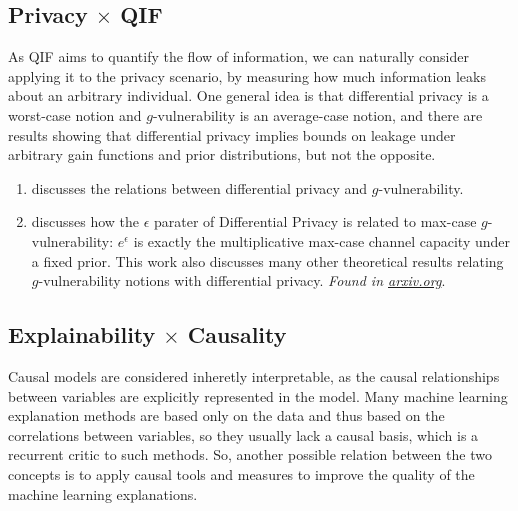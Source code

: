\subsection{Privacy $\times$ QIF}

As QIF aims to quantify the flow of information, we can naturally consider applying it to the privacy scenario, by measuring how much information leaks about an arbitrary individual. One general idea is that differential privacy is a worst-case notion and $g$-vulnerability is an average-case notion, and there are results\cite{QIF} showing that differential privacy implies bounds on leakage under arbitrary gain functions and prior distributions, but not the opposite.

\begin{enumerate}
\item \cite{On the information leakage of Differentially Private Mechanisms} discusses the relations between differential privacy and $g$-vulnerability. 

\item \cite{Explaining epsilon in local differential privacy through the lens of quantitative information flow} discusses how the $\epsilon$ parater of Differential Privacy is related to max-case $g$-vulnerability: $e^\epsilon$ is exactly the multiplicative max-case channel capacity under a fixed prior. This work also discusses many other theoretical results relating $g$-vulnerability notions with differential privacy. \emph{Found in \url{arxiv.org}}.
\end{enumerate}

\subsection{Explainability $\times$ Causality}

Causal models are considered inheretly interpretable, as the causal relationships between variables are explicitly represented in the model. Many machine learning explanation methods are based only on the data and thus based on the correlations between variables, so they usually lack a causal basis, which is a recurrent critic to such methods. So, another possible relation between the two concepts is to apply causal tools and measures to improve the quality of the machine learning explanations.

